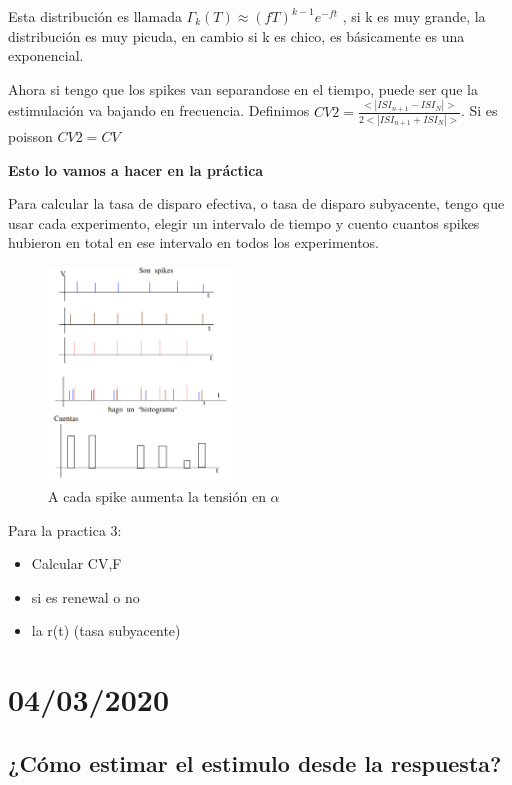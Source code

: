 Esta distribución es llamada $\Gamma_k(T)\approx (fT)^{k-1}e^{-ft}$ , si k es muy grande, la  distribución es muy picuda, en cambio si k es chico, es básicamente es una exponencial.


Ahora si tengo que los spikes van separandose en el tiempo, puede ser que la estimulación va bajando en frecuencia. Definimos $CV2= \frac{<|ISI_{n+1}-ISI_N|>}{2<|ISI_{n+1}+ISI_N|>}$. Si es poisson $CV2=CV$


{\bf Esto lo vamos a hacer en la práctica}

Para calcular la tasa de disparo efectiva, o  tasa de disparo subyacente, tengo que usar cada experimento, elegir un intervalo de tiempo y cuento cuantos spikes hubieron en total en ese intervalo en todos los experimentos.

\begin{figure}[H]
	\centering
	\includegraphics[width=0.45\textwidth]{2-3.png}
	\caption{A cada spike aumenta la tensión en $\alpha$}
\end{figure}

Para la practica 3: 
\begin{itemize}
	\item Calcular CV,F
	\item si es renewal o no
	\item la r(t) (tasa subyacente)
\end{itemize}


\section{04/03/2020}

\subsection{¿Cómo estimar el estimulo desde la respuesta?}

